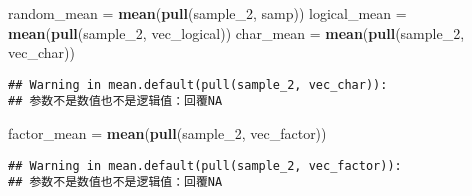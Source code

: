 \documentclass[
]{article}
\newenvironment{Shaded}{\begin{snugshade}}{\end{snugshade}}
\newcommand{\FunctionTok}[1]{\textcolor[rgb]{0.13,0.29,0.53}{\textbf{#1}}}
\newcommand{\NormalTok}[1]{#1}
\newcommand{\OtherTok}[1]{\textcolor[rgb]{0.56,0.35,0.01}{#1}}
\begin{document}
\begin{Shaded}
\begin{Highlighting}[]
\NormalTok{random\_mean }\OtherTok{=} \FunctionTok{mean}\NormalTok{(}\FunctionTok{pull}\NormalTok{(sample\_2, samp))}
\NormalTok{logical\_mean }\OtherTok{=} \FunctionTok{mean}\NormalTok{(}\FunctionTok{pull}\NormalTok{(sample\_2, vec\_logical))}
\NormalTok{char\_mean }\OtherTok{=} \FunctionTok{mean}\NormalTok{(}\FunctionTok{pull}\NormalTok{(sample\_2, vec\_char))}
\end{Highlighting}
\end{Shaded}

\begin{verbatim}
## Warning in mean.default(pull(sample_2, vec_char)):
## 参数不是数值也不是逻辑值：回覆NA
\end{verbatim}

\begin{Shaded}
\begin{Highlighting}[]
\NormalTok{factor\_mean }\OtherTok{=} \FunctionTok{mean}\NormalTok{(}\FunctionTok{pull}\NormalTok{(sample\_2, vec\_factor))}
\end{Highlighting}
\end{Shaded}

\begin{verbatim}
## Warning in mean.default(pull(sample_2, vec_factor)):
## 参数不是数值也不是逻辑值：回覆NA
\end{verbatim}
\end{document}
